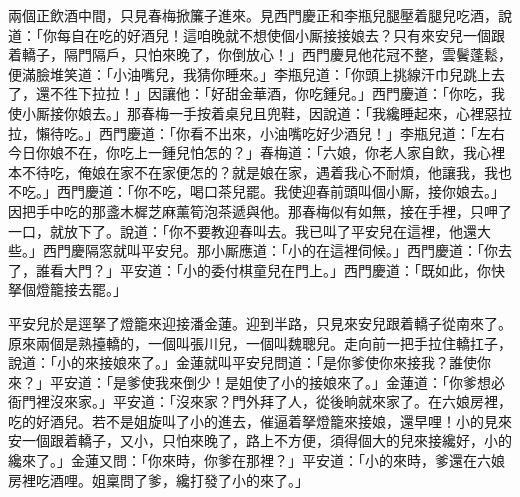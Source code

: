 兩個正飲酒中間，只見春梅掀簾子進來。見西門慶正和李瓶兒腿壓着腿兒吃酒，說道：「你每自在吃的好酒兒！這咱晚就不想使個小厮接接娘去？只有來安兒一個跟着轎子，隔門隔戶，只怕來晚了，你倒放心！」{}西門慶見他花冠不整，雲鬢蓬鬆，便滿臉堆笑道：「小油嘴兒，我猜你睡來。」李瓶兒道：「你頭上挑線汗巾兒跳上去了，還不徃下拉拉！」因讓他：「好甜金華酒，你吃鍾兒。」西門慶道：「你吃，我使小厮接你娘去。」那春梅一手按着桌兒且兜鞋，因說道：「我纔睡起來，心裡惡拉拉，懶待吃。」西門慶道：「你看不出來，小油嘴吃好少酒兒！」李瓶兒道：「左右今日你娘不在，你吃上一鍾兒怕怎的？」春梅道：「六娘，你老人家自飲，我心裡本不待吃，俺娘在家不在家便怎的？就是娘在家，遇着我心不耐煩，他讓我，我也不吃。」西門慶道：「你不吃，喝口茶兒罷。我使迎春前頭叫個小厮，接你娘去。」因把手中吃的那盞木樨芝麻薰筍泡茶遞與他。那春梅似有如無，接在手裡，只呷了一口，就放下了。說道：「你不要教迎春叫去。我已叫了平安兒在這裡，他還大些。」西門慶隔窓就叫平安兒。那小厮應道：「小的在這裡伺候。」西門慶道：「你去了，誰看大門？」平安道：「小的委付棋童兒在門上。」西門慶道：「既如此，你快拏個燈籠接去罷。」

平安兒於是逕拏了燈籠來迎接潘金蓮。迎到半路，只見來安兒跟着轎子從南來了。原來兩個是熟擡轎的，一個叫張川兒，一個叫魏聰兒。走向前一把手拉住轎扛子，說道：「小的來接娘來了。」金蓮就叫平安兒問道：「是你爹使你來接我？誰使你來？」平安道：「是爹使我來倒少！是姐使了小的接娘來了。」金蓮道：「你爹想必衙門裡沒來家。」{}平安道：「沒來家？門外拜了人，從後晌就來家了。在六娘房裡，吃的好酒兒。若不是姐旋叫了小的進去，催逼着拏燈籠來接娘，還早哩！小的見來安一個跟着轎子，又小，只怕來晚了，路上不方便，須得個大的兒來接纔好，小的纔來了。」金蓮又問：「你來時，你爹在那裡？」平安道：「小的來時，爹還在六娘房裡吃酒哩。姐稟問了爹，纔打發了小的來了。」

